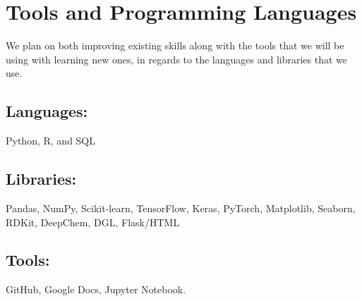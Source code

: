 \documentclass{report}
\begin{document}
\chapter{Tools and Programming Languages}

We plan on both improving existing skills along with the tools that we will be using with learning new ones, in regards to the languages and libraries that we use.

\section{Languages:}
Python, R, and SQL
\section{Libraries:}
Pandas, NumPy, Scikit-learn, TensorFlow, Keras, PyTorch, Matplotlib, Seaborn, RDKit, DeepChem, DGL, Flask/HTML
\section{Tools:}
GitHub, Google Docs, Jupyter Notebook. 
\end{document}
